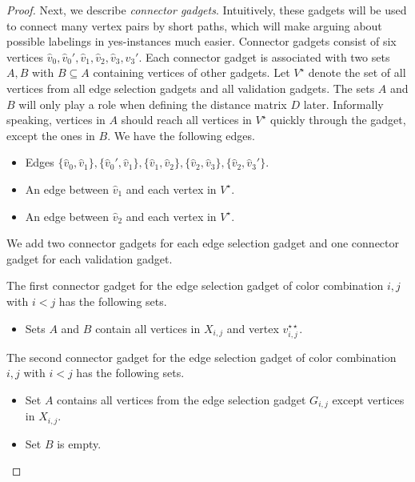 \documentclass[11pt,a4paper]{article}
\theoremstyle{remark}
\theoremstyle{definition}
\begin{document}
\begin{proof}
    Next, we describe \emph{connector gadgets}. Intuitively, these gadgets will be used to connect many vertex pairs by short paths, which will make arguing about possible labelings in yes-instances much easier. Connector gadgets consist of six vertices $\hat{v}_0,\hat{v}_0',\hat{v}_1,\hat{v}_2,\hat{v}_3,\hat{v}_3'$. 
    Each connector gadget is associated with two sets $A,B$ with $B\subseteq A$ containing vertices of other gadgets. 
    Let $V^\star$ denote the set of all vertices from all edge selection gadgets and all validation gadgets.
    The sets $A$ and $B$ will only play a role when defining the distance matrix $D$ later. Informally speaking, vertices in $A$ should reach all vertices in $V^\star$ quickly through the gadget, except the ones in $B$.
    We have the following edges. 
    \begin{itemize}
        \item Edges $\{\hat{v}_0,\hat{v}_1\},\{\hat{v}_0',\hat{v}_1\},\{\hat{v}_1,\hat{v}_2\},\{\hat{v}_2,\hat{v}_3\},\{\hat{v}_2,\hat{v}_3'\}$.
        \item An edge between $\hat{v}_1$ and each vertex in $V^\star$.
        \item An edge between $\hat{v}_2$ and each vertex in $V^\star$.
    \end{itemize}
    We add two connector gadgets for each edge selection gadget and one connector gadget for each validation gadget.
    
    The first connector gadget for the edge selection gadget of color combination $i,j$ with $i<j$ has the following sets.
    \begin{itemize}
        \item Sets $A$ and $B$ contain all vertices in $X_{i,j}$ and vertex $v_{i,j}^{\star\star}$.
    \end{itemize}
    The second connector gadget for the edge selection gadget of color combination $i,j$ with $i<j$ has the following sets.
    \begin{itemize}
        \item Set $A$ contains all vertices from the edge selection gadget $G_{i,j}$ except vertices in $X_{i,j}$.
        \item Set $B$ is empty.
    \end{itemize}


\end{proof}
\end{document}
